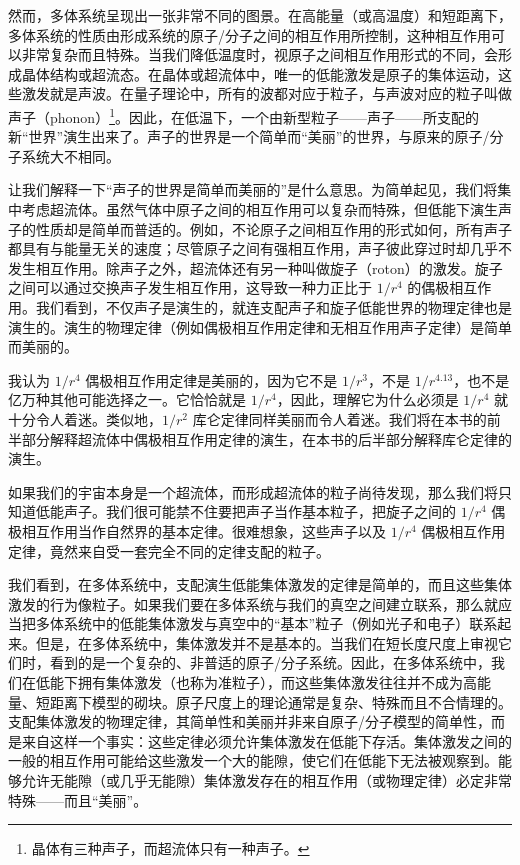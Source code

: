 然而，多体系统呈现出一张非常不同的图景。在高能量（或高温度）和短距离下，多体系统的性质由形成系统的原子/分子之间的相互作用所控制，这种相互作用可以非常复杂而且特殊。当我们降低温度时，视原子之间相互作用形式的不同，会形成晶体结构或超流态。在晶体或超流体中，唯一的低能激发是原子的集体运动，这些激发就是声波。在量子理论中，所有的波都对应于粒子，与声波对应的粒子叫做声子（phonon）\footnote{晶体有三种声子，而超流体只有一种声子。}。因此，在低温下，一个由新型粒子——声子——所支配的新“世界”演生出来了。声子的世界是一个简单而“美丽”的世界，与原来的原子/分子系统大不相同。

让我们解释一下“声子的世界是简单而美丽的”是什么意思。为简单起见，我们将集中考虑超流体。虽然气体中原子之间的相互作用可以复杂而特殊，但低能下演生声子的性质却是简单而普适的。例如，不论原子之间相互作用的形式如何，所有声子都具有与能量无关的速度；尽管原子之间有强相互作用，声子彼此穿过时却几乎不发生相互作用。除声子之外，超流体还有另一种叫做旋子（roton）的激发。旋子之间可以通过交换声子发生相互作用，这导致一种力正比于 $1/r^4$ 的偶极相互作用。我们看到，不仅声子是演生的，就连支配声子和旋子低能世界的物理定律也是演生的。演生的物理定律（例如偶极相互作用定律和无相互作用声子定律）是简单而美丽的。

我认为 $1/r^4$ 偶极相互作用定律是美丽的，因为它不是 $1/r^3$，不是 $1/r^{4.13}$，也不是亿万种其他可能选择之一。它恰恰就是 $1/r^4$，因此，理解它为什么必须是 $1/r^4$ 就十分令人着迷。类似地，$1/r^2$ 库仑定律同样美丽而令人着迷。我们将在本书的前半部分解释超流体中偶极相互作用定律的演生，在本书的后半部分解释库仑定律的演生。

如果我们的宇宙本身是一个超流体，而形成超流体的粒子尚待发现，那么我们将只知道低能声子。我们很可能禁不住要把声子当作基本粒子，把旋子之间的 $1/r^4$ 偶极相互作用当作自然界的基本定律。很难想象，这些声子以及 $1/r^4$ 偶极相互作用定律，竟然来自受一套完全不同的定律支配的粒子。

我们看到，在多体系统中，支配演生低能集体激发的定律是简单的，而且这些集体激发的行为像粒子。如果我们要在多体系统与我们的真空之间建立联系，那么就应当把多体系统中的低能集体激发与真空中的“基本”粒子（例如光子和电子）联系起来。但是，在多体系统中，集体激发并不是基本的。当我们在短长度尺度上审视它们时，看到的是一个复杂的、非普适的原子/分子系统。因此，在多体系统中，我们在低能下拥有集体激发（也称为准粒子），而这些集体激发往往并不成为高能量、短距离下模型的砌块。原子尺度上的理论通常是复杂、特殊而且不合情理的。支配集体激发的物理定律，其简单性和美丽并非来自原子/分子模型的简单性，而是来自这样一个事实：这些定律必须允许集体激发在低能下存活。集体激发之间的一般的相互作用可能给这些激发一个大的能隙，使它们在低能下无法被观察到。能够允许无能隙（或几乎无能隙）集体激发存在的相互作用（或物理定律）必定非常特殊——而且“美丽”。

